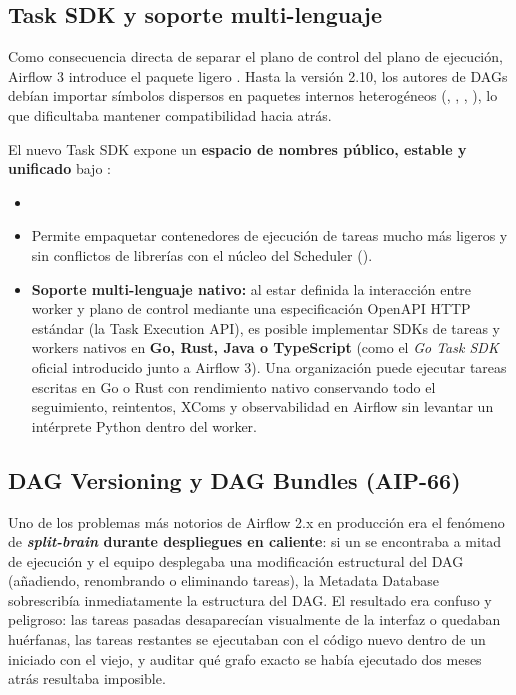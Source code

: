 \subsection{Task SDK y soporte multi-lenguaje}\label{subsec:task-sdk}

Como consecuencia directa de separar el plano de control del plano de ejecución, Airflow 3 introduce el paquete ligero . Hasta la versión 2.10, los autores de DAGs debían importar símbolos dispersos en paquetes internos heterogéneos (, , , ), lo que dificultaba mantener compatibilidad hacia atrás.

El nuevo Task SDK expone un \textbf{espacio de nombres público, estable y unificado} bajo :
\begin{itemize}
  \item {}
  \item Permite empaquetar contenedores de ejecución de tareas mucho más ligeros y sin conflictos de librerías con el núcleo del Scheduler ().
  \item \textbf{Soporte multi-lenguaje nativo:} al estar definida la interacción entre worker y plano de control mediante una especificación OpenAPI HTTP estándar (la Task Execution API), es posible implementar SDKs de tareas y workers nativos en \textbf{Go, Rust, Java o TypeScript} (como el \textit{Go Task SDK} oficial introducido junto a Airflow 3). Una organización puede ejecutar tareas escritas en Go o Rust con rendimiento nativo conservando todo el seguimiento, reintentos, XComs y observabilidad en Airflow sin levantar un intérprete Python dentro del worker.
\end{itemize}

\subsection{DAG Versioning y DAG Bundles (AIP-66)}\label{subsec:dag-versioning}

Uno de los problemas más notorios de Airflow 2.x en producción era el fenómeno de \textbf{\textit{split-brain} durante despliegues en caliente}: si un  se encontraba a mitad de ejecución y el equipo desplegaba una modificación estructural del DAG (añadiendo, renombrando o eliminando tareas), la Metadata Database sobrescribía inmediatamente la estructura del DAG. El resultado era confuso y peligroso: las tareas pasadas desaparecían visualmente de la interfaz o quedaban huérfanas, las tareas restantes se ejecutaban con el código nuevo dentro de un  iniciado con el viejo, y auditar qué grafo exacto se había ejecutado dos meses atrás resultaba imposible.

